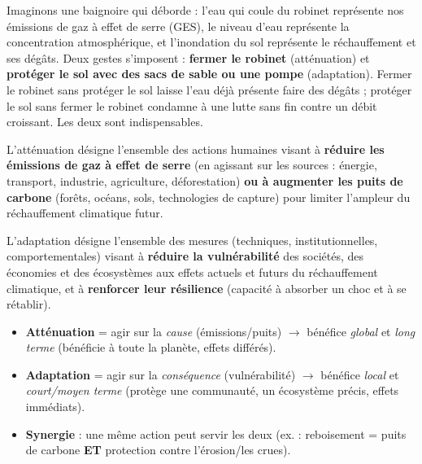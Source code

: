 \documentclass[11pt]{article}
\newcommand{\cle}[1]{{\popxbold\color{popdark}#1}}
\begin{document}
Imaginons une baignoire qui déborde : l'eau qui coule du robinet représente nos émissions de gaz à effet de serre (GES), le niveau d'eau représente la concentration atmosphérique, et l'inondation du sol représente le réchauffement et ses dégâts. Deux gestes s'imposent : \textbf{fermer le robinet} (atténuation) et \textbf{protéger le sol avec des sacs de sable ou une pompe} (adaptation). Fermer le robinet sans protéger le sol laisse l'eau déjà présente faire des dégâts ; protéger le sol sans fermer le robinet condamne à une lutte sans fin contre un débit croissant. Les deux sont indispensables.

\begin{definition}
L'\cle{atténuation} désigne l'ensemble des actions humaines visant à \textbf{réduire les émissions de gaz à effet de serre} (en agissant sur les sources : énergie, transport, industrie, agriculture, déforestation) \textbf{ou à augmenter les puits de carbone} (forêts, océans, sols, technologies de capture) pour limiter l'ampleur du réchauffement climatique futur.
\end{definition}

\begin{definition}[Adaptation]
L'\cle{adaptation} désigne l'ensemble des mesures (techniques, institutionnelles, comportementales) visant à \textbf{réduire la vulnérabilité} des sociétés, des économies et des écosystèmes aux effets actuels et futurs du réchauffement climatique, et à \textbf{renforcer leur résilience} (capacité à absorber un choc et à se rétablir).
\end{definition}

\begin{aretenir}
\begin{itemize}
    \item \textbf{Atténuation} = agir sur la \emph{cause} (émissions/puits) $\rightarrow$ bénéfice \emph{global} et \emph{long terme} (bénéficie à toute la planète, effets différés).
    \item \textbf{Adaptation} = agir sur la \emph{conséquence} (vulnérabilité) $\rightarrow$ bénéfice \emph{local} et \emph{court/moyen terme} (protège une communauté, un écosystème précis, effets immédiats).
    \item \textbf{Synergie} : une même action peut servir les deux (ex. : reboisement = puits de carbone \textbf{ET} protection contre l'érosion/les crues).
\end{itemize}
\end{aretenir}
\end{document}
